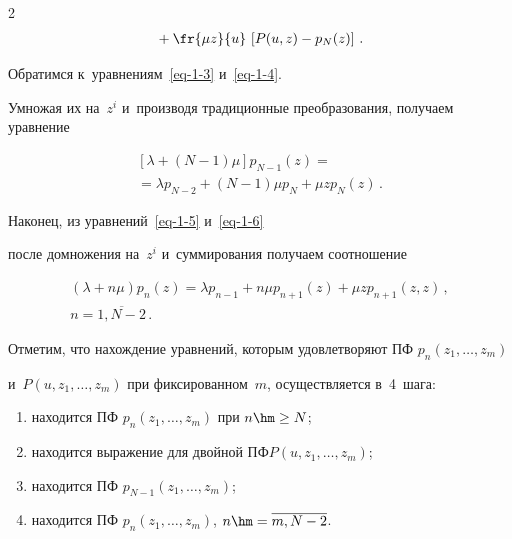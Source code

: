\begin{multicols}{2}
\begin{multline}
{}+\fr{\mu z }{u}\, \left[P(u,z)-p_{N}(z)\right] \,.


\end{multline}


Обратимся к~уравнениям~\eqref{eq-1-3} и~\eqref{eq-1-4}.


Умножая их на~$z^i$ и~производя традиционные преобразования, получаем уравнение


\begin{multline}


\label{eq-z-3}


[\lambda+(N-1)\mu] p_{N-1}(z) ={}\\


{}= \lambda p_{N-2} +


(N-1)\mu p_{N} + \mu z p_N(z)\,.


\end{multline}


Наконец, из уравнений~\eqref{eq-1-5} и~\eqref{eq-1-6}


после домножения на~$z^i$ и~суммирования получаем соотношение


\begin{multline}


\label{eq-z-4}


(\lambda+n\mu) p_{n}(z) = \lambda p_{n-1}+ n\mu p_{n+1}(z)+


\mu z p_{n+1}(z,z) \,,\\ 


n=\overline{1,N-2}\,.






\end{multline}


Отметим, что нахождение уравнений, которым удовле\-тво\-ря\-ют ПФ $p_{n}(z_1,\ldots,z_m)$ 


и~$P(u,z_1,\ldots,z_m)$ при фиксированном~$m$, осуществляется в~4~шага:


\begin{enumerate}[(1)]


\item находится ПФ $p_{n}(z_1,\ldots,z_{m})$ при $n \hm\ge N$;


\item находится выражение для двойной $ПФ P(u,z_1,\ldots,z_m)$;


\item находится ПФ $p_{N-1}(z_1,\ldots,z_{m})$; 


\item находится ПФ $p_{n}(z_1,\ldots,z_{m})$, $n\hm=\overline{m,N-2}$.



\end{enumerate}
\end{multicols}
